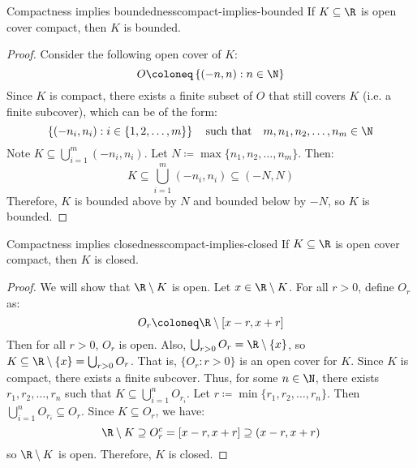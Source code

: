 \begin{thmbox}{Compactness implies boundedness}{compact-implies-bounded}
    If $K \subseteq \R$ is open cover compact, then $K$ is bounded.
    \tcblower
    \begin{proof}
        Consider the following open cover of $K$:
        \[ O \coloneq \left\{ (-n ,n) : n \in \N \right\} \]
        Since $K$ is compact, there exists a finite subset of $O$ that still covers $K$ (i.e. a finite subcover), which can be of the form:
        \[ \left\{ (-n_i, n_i) : i \in \{ 1,2,\ldots,m \} \right\} \quad \text{such that} \quad m, n_1, n_2, \ldots, n_m \in \N \]
        Note $K \subseteq \bigcup_{i=1}^{m} (-n_i, n_i)$. Let $N \coloneq \max\{n_1, n_2, \ldots, n_m\}$. Then:
        \[ K \subseteq \bigcup_{i = 1}^m \left( -n_i, n_i \right) \subseteq (-N, N) \]
        Therefore, $K$ is bounded above by $N$ and bounded below by $-N$, so $K$ is bounded.
    \end{proof}
\end{thmbox}

\begin{thmbox}{Compactness implies closedness}{compact-implies-closed}
    If $K \subseteq \R$ is open cover compact, then $K$ is closed.
    \tcblower
    \begin{proof}
        We will show that $\R \setminus K$ is open. Let $x \in \R \setminus K$. For all $r > 0$, define $O_r$ as:
        \[O_r \coloneq \R \setminus [x-r, x+r]\]
        Then for all $r > 0$, $O_r$ is open. Also, $\bigcup_{r>0} O_r = \R \setminus \{x\}$, so $K \subseteq \R \setminus \{x\} = \bigcup_{r>0}O_r$. That is, $\{O_r : r > 0\}$ is an open cover for $K$. Since $K$ is compact, there exists a finite subcover. Thus, for some $n \in \N$, there exists $r_1, r_2, \ldots, r_n$ such that $K \subseteq \bigcup_{i=1}^{n} O_{r_i}$. Let $r \coloneq \min\{r_1, r_2, \ldots, r_n\}$. Then $\bigcup_{i=1}^{n} O_{r_i} \subseteq O_r$. Since $K \subseteq O_r$, we have:
        \[ \R \setminus K \supseteq O_r^c = [x-r, x+r] \supseteq (x-r, x+r) \]
        so $\R \setminus K$ is open. Therefore, $K$ is closed.
    \end{proof}
\end{thmbox}


